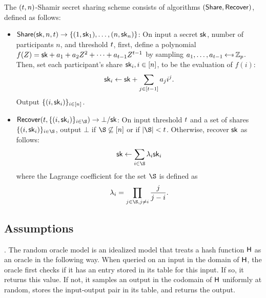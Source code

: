 \begin{definition} \label{defn:shamir}
The $(t, n)$-Shamir secret sharing scheme consists of algorithms $(\mathsf{Share}, \allowbreak \mathsf{Recover})$, defined as follows:

\begin{itemize}[itemsep=1mm]
    \item $\mathsf{Share}(\mathsf{sk}, n, t) \rightarrow \{ (1, \mathsf{sk}_1), \ldots, (n, \mathsf{sk}_n)\}$:
      On input a secret $\mathsf{sk}$, number of participants $n$, and threshold $t$, first, define a polynomial $f(Z) = \mathsf{sk} + a_1 + a_2 Z^2 + \cdots + a_{t-1} Z^{t-1}$ by sampling $a_1, \ldots, a_{\tcor} \randpick \Zp$. Then, set each participant's share $\mathsf{sk}_i, i \in [n]$, to be the evaluation of $f(i)$:
    \begin{equation*} \label{eq:issueshares}
        \mathsf{sk}_i \gets \mathsf{sk} + \sum_{j \in [t-1]} a_j i^j.
    \end{equation*}
    Output $\{(i, \mathsf{sk}_i) \}_{i \in [n]}$.

  \item $ \Recover(\thresh, \{ (i, \sk_i)\}_{ i \in \S}) \rightarrow \bot / \sk$:
    On input threshold $t$ and a set of shares $\{(i, \sk_i) \}_{i \in \S}$,
    output $\bot$ if $\S \not\subseteq \set{n}$ or if $\lvert \S \rvert < \thresh$. Otherwise, recover $\mathsf{sk}$ as follows:
    \begin{equation*} \label{eq:recovershares}
      \sk \gets \sum_{i \in \S} \lambda_i \sk_i
    \end{equation*}
    where the Lagrange coefficient for the set
$\S$ is defined as
\[ \lambda_i = \prod_{j \in \S, j\neq i} \frac{j}{j - i} .\]
\end{itemize}
\end{definition}

\subsection{Assumptions}

. The random oracle model is an idealized model that treats a hash function $\mathsf{H}$ as an oracle in the following way.  When queried on an input in the domain of $\mathsf{H}$, the oracle first checks if it has an entry stored in its table for this input.  If so, it returns this value.  If not, it samples an output in the codomain of $\mathsf{H}$ uniformly at random, stores the input-output pair in its table, and returns the output.

